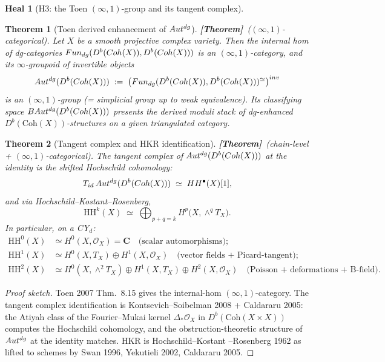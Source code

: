 \documentclass[11pt]{amsart}
\newtheorem{theorem}{Theorem}
\theoremstyle{definition}
\newtheorem{heal}[attack]{Heal}
\providecommand{\Coh}{\mathrm{Coh}}
\providecommand{\Autdg}{\mathrm{Aut}^{\rm dg}}
\providecommand{\cO}{\mathcal{O}}
\providecommand{\bC}{\mathbf{C}}
\providecommand{\ClaimStatusTheorem}{\textbf{[Theorem]}}
\begin{document}
\begin{heal}[H3: the Toen $(\infty,1)$-group and its tangent
complex]
\leavevmode

\begin{theorem}[Toen derived enhancement of $\Autdg$]
\label{thm:toen-enhancement}
\ClaimStatusTheorem\ ($(\infty,1)$-categorical). Let $X$ be a smooth
projective complex variety. Then the internal hom of dg-categories
$\mathrm{Fun}_{\rm dg}(D^b(\Coh(X)), D^b(\Coh(X)))$ is an
$(\infty,1)$-category, and its $\infty$-groupoid of invertible
objects
\[
 \Autdg(D^b(\Coh(X))) \;:=\;
 \bigl(\mathrm{Fun}_{\rm dg}(D^b(\Coh(X)), D^b(\Coh(X)))^{\simeq}\bigr)^{\rm inv}
\]
is an $(\infty,1)$-group (= simplicial group up to weak equivalence).
Its classifying space $B\Autdg(D^b(\Coh(X)))$ presents the
derived moduli stack of dg-enhanced $D^b(\Coh(X))$-structures on a
given triangulated category.
\end{theorem}

\begin{theorem}[Tangent complex and HKR identification]
\label{thm:tangent-HKR}
\ClaimStatusTheorem\ (chain-level + $(\infty,1)$-categorical). The
tangent complex of $\Autdg(D^b(\Coh(X)))$ at the identity is the
shifted Hochschild cohomology:
\[
 T_{\mathrm{id}}\, \Autdg(D^b(\Coh(X)))
 \;\simeq\; \mathrm{HH}^\bullet(X)[1],
\]
and via Hochschild--Kostant--Rosenberg,
\[
 \mathrm{HH}^k(X)
 \;\simeq\; \bigoplus_{p + q = k}
 H^p\bigl(X, \wedge^q T_X\bigr).
\]
In particular, on a CY$_d$:
\begin{align*}
 \mathrm{HH}^0(X) &\simeq H^0(X, \cO_X) = \bC \quad \text{(scalar
 automorphisms)};\\
 \mathrm{HH}^1(X) &\simeq H^0(X, T_X) \oplus H^1(X, \cO_X) \quad
 \text{(vector fields + Picard-tangent)};\\
 \mathrm{HH}^2(X) &\simeq H^0(X, \wedge^2 T_X) \oplus H^1(X, T_X)
 \oplus H^2(X, \cO_X) \quad \text{(Poisson + deformations + B-field)}.
\end{align*}
\end{theorem}

\begin{proof}[Proof sketch]
Toen 2007 Thm.~8.15 gives the internal-hom $(\infty,1)$-category.
The tangent complex identification is Kontsevich--Soibelman 2008 +
Caldararu 2005: the Atiyah class of the Fourier--Mukai kernel
$\Delta_* \cO_X$ in $D^b(\Coh(X \times X))$ computes the
Hochschild cohomology, and the obstruction-theoretic structure of
$\Autdg$ at the identity matches. HKR is Hochschild--Kostant
--Rosenberg 1962 as lifted to schemes by Swan 1996, Yekutieli 2002,
Caldararu 2005.
\end{proof}


\end{heal}
\end{document}
